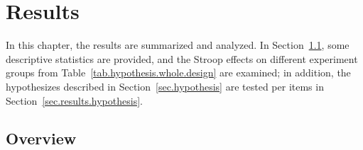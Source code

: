 \chapter{Results}\label{chp.results}
In this chapter, the results are summarized and analyzed. 
In Section~\ref{sec.results.overview},
some descriptive statistics are provided, and 
the Stroop effects on different experiment groups from 
Table~\ref{tab.hypothesis.whole.design} are examined;
in addition,
the hypothesizes described in Section~\ref{sec.hypothesis} are tested per items in Section~\ref{sec.results.hypothesis}.



\section{Overview}\label{sec.results.overview}
\begin{table}[!b]
\centering
{}
\caption{Overall statistics for accuracy rate and response time. In addition,
the two-tailed p-value from a paired t-test is also reported.}\label{tab.results.overview}
\end{table}



\begin{table}[!t]
\centering
{}
\caption{The accuracy rate with (SD) for the production of facial expressions in the different conditions.}
\label{tab.results.accuracyrate}
\end{table}


